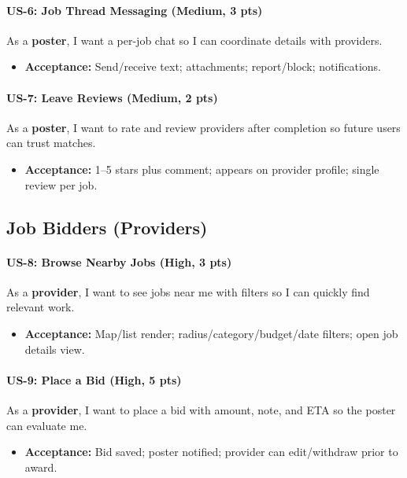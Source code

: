 \documentclass[11pt]{article}
\begin{document}
\paragraph{US-6: Job Thread Messaging (Medium, 3 pts)}
As a \textbf{poster}, I want a per-job chat so I can coordinate details with providers.
\begin{itemize}[leftmargin=1.4em]
  \item \textbf{Acceptance:} Send/receive text; attachments; report/block; notifications.
\end{itemize}

\paragraph{US-7: Leave Reviews (Medium, 2 pts)}
As a \textbf{poster}, I want to rate and review providers after completion so future users can trust matches.
\begin{itemize}[leftmargin=1.4em]
  \item \textbf{Acceptance:} 1–5 stars plus comment; appears on provider profile; single review per job.
\end{itemize}

\subsection*{Job Bidders (Providers)}
\paragraph{US-8: Browse Nearby Jobs (High, 3 pts)}
As a \textbf{provider}, I want to see jobs near me with filters so I can quickly find relevant work.
\begin{itemize}[leftmargin=1.4em]
  \item \textbf{Acceptance:} Map/list render; radius/category/budget/date filters; open job details view.
\end{itemize}

\paragraph{US-9: Place a Bid (High, 5 pts)}
As a \textbf{provider}, I want to place a bid with amount, note, and ETA so the poster can evaluate me.
\begin{itemize}[leftmargin=1.4em]
  \item \textbf{Acceptance:} Bid saved; poster notified; provider can edit/withdraw prior to award.
\end{itemize}
\end{document}
